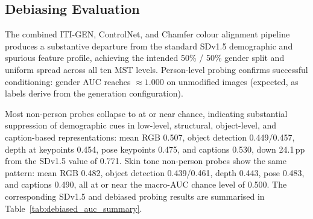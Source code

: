 \subsection{Debiasing Evaluation}

The combined ITI-GEN, ControlNet, and Chamfer colour alignment pipeline produces a
substantive departure from the standard SDv1.5 demographic and spurious feature profile,
achieving the intended 50\% / 50\% gender split and uniform spread across all ten MST
levels. Person-level probing confirms successful conditioning: gender AUC reaches
${\approx}1.000$ on unmodified images (expected, as labels derive from the generation
configuration).

Most non-person probes collapse to at or near chance, indicating substantial suppression
of demographic cues in low-level, structural, object-level, and caption-based
representations: mean RGB 0.507, object detection 0.449/0.457, depth at keypoints
0.454, pose keypoints 0.475, and captions 0.530, down 24.1\,pp from the SDv1.5 value of
0.771. Skin tone non-person probes show the same pattern: mean RGB 0.482, object
detection 0.439/0.461, depth 0.443, pose 0.483, and captions 0.490, all at or near the
macro-AUC chance level of 0.500. The corresponding SDv1.5 and debiased probing results
are summarised in Table~\ref{tab:debiased_auc_summary}.

